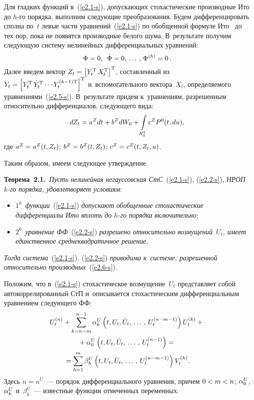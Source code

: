 \begin{multicols}{2}
Для гладких функций в~(\ref{e2.1-s}), допускающих стохастические производные Ито до $h$-го порядка, выполним  следующие преобразования.
Будем дифференцировать сполна по~$t$ левые части уравнений~(\ref{e2.1-s}) по обобщенной 
формуле Ито~\cite{11-s, 12-s} до тех пор, пока не появятся производные белого шума. 
В~результате получим следующую сис\-те\-му нелинейных дифференциальных уравнений:
    \begin{equation}
    \Phi=0,\enskip \dot \Phi =0,\,\ldots\,,\, \Phi^{(h)}=0\,.
    \label{e2.5-s}
    \end{equation}
Далее введем вектор  $Z_t \hm= \lk Y_t^{\mathrm{T}}\, X_t^{\mathrm{T}}\rk^{\mathrm{T}}$, составленный из $Y_t\hm= \lk 
Y_t^{\mathrm{T}}\, \dot Y_t^{\mathrm{T}}\cdots Y_t^{(k-1)\mathrm{T}}\rk^{\mathrm{T}}$ и~вспомогательного вектора~$X_t$, 
определяемого уравнениями~(\ref{e2.5-s}).
В~результате придем к~уравнениям, разрешенным относительно дифференциалов, 
следующего вида:
\begin{equation}
dZ_t = a^Z  dt + b^Z d W_0 + \int\limits_{R_0^q} c^Z P^0(t,du),\label{e2.6-s}
\end{equation}
где $a^Z \hm= a^Z(t,Z_t)$; $b^Z\hm=b^Z(t,Z_t)$; $ c^Z\hm=c^Z(t,Z_t, u)$.

Таким образом, имеем следующее утверждение.

\smallskip

\noindent
\textbf{Теорема~2.1.}\ \textit{Пусть нелинейная негауссовская СтС}~(\ref{e2.1-s}), (\ref{e2.2-s}), 
\textit{НРОП $k$-го порядка, удовлетворяет условиям}:
\begin{itemize}
\item[\,] $1^0$~\textit{функции}~(\ref{e2.1-s}) \textit{допускают обобщенные стохастические дифференциалы Ито вплоть 
до $h$-го порядка включительно};

\item[\,] $2^0$~\textit{уравнение ФФ}~(\ref{e2.2-s}) \textit{разрешено относительно возмущений~$U_t$, имеет 
единственное среднеквадратичное решение}.
\end{itemize}
\textit{Тогда система}~(\ref{e2.1-s}), (\ref{e2.2-s}) \textit{приводима к~сис\-те\-ме, разрешенной относительно 
производных}~(\ref{e2.6-s}).

\smallskip


Положим, что в~(\ref{e2.1-s}) стохастическое возмущение~$U_t$ представляет собой 
автокоррелированный СтП и~описывается стохастическим дифференциальным уравнением 
следующего ФФ:
\begin{multline}
U_t^{(n)} + \sum\limits_{k=n-m}^{n-1}\alpha_k^U \left(t,U_t, \dot U_t ,\,\ldots\,,\, U_t^{(n-m-1)}\right) U_t^{(k)} + {}\\
{}+
\alpha_0^U \left(t,  U_t, \dot U_t ,\,\ldots\,,\, U_t^{(n-1)}\right) ={}\\
{}= \sum\limits_{h=1}^m \beta_h^U \left(t,  U_t, \dot U_t ,\,\ldots\,,\, U_t^{(n-m-1)}\right)V_t^{(h)}.\label{e2.7-s}
\end{multline}
Здесь $n=n^U$~--- порядок дифференциального уравнения, причем $0\hm<m\hm<n$; 
$\alpha_0^U$, $\alpha_k^U$ и~$\beta_k^U$~--- известные функции отмеченных переменных.


\end{multicols}

